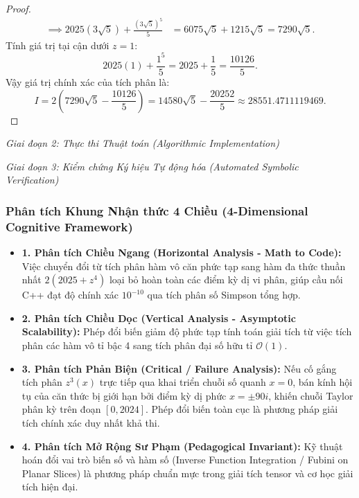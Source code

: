 \documentclass{article}
\begin{document}
\begin{proof}
\begin{align}
    \implies 2025(3\sqrt{5}) + \frac{(3\sqrt{5})^5}{5} &= 6075\sqrt{5} + 1215\sqrt{5} = 7290\sqrt{5}.
\end{align}
Tính giá trị tại cận dưới $z = 1$:
\begin{equation}
    2025(1) + \frac{1^5}{5} = 2025 + \frac{1}{5} = \frac{10126}{5}.
\end{equation}
Vậy giá trị chính xác của tích phân là:
\begin{equation}
    I = 2 \left( 7290\sqrt{5} - \frac{10126}{5} \right) = 14580\sqrt{5} - \frac{20252}{5} \approx 28551.4711119469.
\end{equation}
\end{proof}

\vspace{0.5em}\noindent\emph{Giai đoạn 2: Thực thi Thuật toán (Algorithmic Implementation)}


\vspace{0.5em}\noindent\emph{Giai đoạn 3: Kiểm chứng Ký hiệu Tự động hóa (Automated Symbolic Verification)}


\subsubsection*{Phân tích Khung Nhận thức 4 Chiều (4-Dimensional Cognitive Framework)}
\begin{itemize}
    \item \textbf{1. Phân tích Chiều Ngang (Horizontal Analysis - Math to Code):} Việc chuyển đổi từ tích phân hàm vô căn phức tạp sang hàm đa thức thuần nhất $2(2025+z^4)$ loại bỏ hoàn toàn các điểm kỳ dị vi phân, giúp cầu nối C++ đạt độ chính xác $10^{-10}$ qua tích phân số Simpson tổng hợp.
    \item \textbf{2. Phân tích Chiều Dọc (Vertical Analysis - Asymptotic Scalability):} Phép đổi biến giảm độ phức tạp tính toán giải tích từ việc tích phân các hàm vô tỉ bậc 4 sang tích phân đại số hữu tỉ $\mathcal{O}(1)$.
    \item \textbf{3. Phân tích Phản Biện (Critical / Failure Analysis):} Nếu cố gắng tích phân $z^3(x)$ trực tiếp qua khai triển chuỗi số quanh $x = 0$, bán kính hội tụ của căn thức bị giới hạn bởi điểm kỳ dị phức $x = \pm 90i$, khiến chuỗi Taylor phân kỳ trên đoạn $[0, 2024]$. Phép đổi biến toàn cục là phương pháp giải tích chính xác duy nhất khả thi.
    \item \textbf{4. Phân tích Mở Rộng Sư Phạm (Pedagogical Invariant):} Kỹ thuật hoán đổi vai trò biến số và hàm số (Inverse Function Integration / Fubini on Planar Slices) là phương pháp chuẩn mực trong giải tích tensor và cơ học giải tích hiện đại.
\end{itemize}
\end{document}
